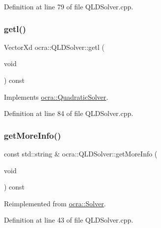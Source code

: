 Definition at line 79 of file Q\+L\+D\+Solver.\+cpp.

\hypertarget{classocra_1_1QLDSolver_aa79266a95a76ec3e3c7bd6d92af1cbcb}{}\label{classocra_1_1QLDSolver_aa79266a95a76ec3e3c7bd6d92af1cbcb} 
\subsubsection{\texorpdfstring{getl()}{getl()}}
{\footnotesize\ttfamily Vector\+Xd ocra\+::\+Q\+L\+D\+Solver\+::getl (\begin{DoxyParamCaption}\item[{void}]{ }\end{DoxyParamCaption}) const\hspace{0.3cm}{\ttfamily [virtual]}}



Implements \hyperlink{classocra_1_1QuadraticSolver_a13e3a471615ca667daadf490dedc18eb}{ocra\+::\+Quadratic\+Solver}.



Definition at line 84 of file Q\+L\+D\+Solver.\+cpp.

\hypertarget{classocra_1_1QLDSolver_a387f7b02e2cac27c91a0e36c2b473722}{}\label{classocra_1_1QLDSolver_a387f7b02e2cac27c91a0e36c2b473722} 
\subsubsection{\texorpdfstring{get\+More\+Info()}{getMoreInfo()}}
{\footnotesize\ttfamily const std\+::string \& ocra\+::\+Q\+L\+D\+Solver\+::get\+More\+Info (\begin{DoxyParamCaption}\item[{void}]{ }\end{DoxyParamCaption}) const\hspace{0.3cm}{\ttfamily [virtual]}}



Reimplemented from \hyperlink{classocra_1_1Solver_a3ebcf70ad5466cd31f27811ad6ccdfff}{ocra\+::\+Solver}.



Definition at line 43 of file Q\+L\+D\+Solver.\+cpp.

\hypertarget{classocra_1_1QLDSolver_a1c710dd84d8e2ff4f87e3e20a9b656ee}{}\label{classocra_1_1QLDSolver_a1c710dd84d8e2ff4f87e3e20a9b656ee} 
